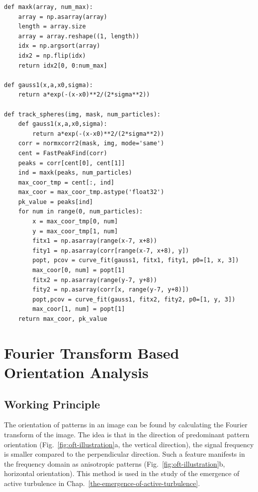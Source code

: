 \begin{verbatim}
def maxk(array, num_max):
    array = np.asarray(array)
    length = array.size
    array = array.reshape((1, length))
    idx = np.argsort(array)
    idx2 = np.flip(idx)
    return idx2[0, 0:num_max]

def gauss1(x,a,x0,sigma):
    return a*exp(-(x-x0)**2/(2*sigma**2))

def track_spheres(img, mask, num_particles):
    def gauss1(x,a,x0,sigma):
        return a*exp(-(x-x0)**2/(2*sigma**2))
    corr = normxcorr2(mask, img, mode='same')
    cent = FastPeakFind(corr)
    peaks = corr[cent[0], cent[1]]
    ind = maxk(peaks, num_particles)
    max_coor_tmp = cent[:, ind]
    max_coor = max_coor_tmp.astype('float32')
    pk_value = peaks[ind]
    for num in range(0, num_particles):
        x = max_coor_tmp[0, num]
        y = max_coor_tmp[1, num]
        fitx1 = np.asarray(range(x-7, x+8))
        fity1 = np.asarray(corr[range(x-7, x+8), y])
        popt, pcov = curve_fit(gauss1, fitx1, fity1, p0=[1, x, 3])
        max_coor[0, num] = popt[1]
        fitx2 = np.asarray(range(y-7, y+8))
        fity2 = np.asarray(corr[x, range(y-7, y+8)])
        popt,pcov = curve_fit(gauss1, fitx2, fity2, p0=[1, y, 3])
        max_coor[1, num] = popt[1]
    return max_coor, pk_value
\end{verbatim}


\section{Fourier Transform Based Orientation Analysis}
\label{sec:A-fourier-transform-based-orientation-analysis}
\subsection{Working Principle}
The orientation of patterns in an image can be found by calculating the Fourier transform of the image. The idea is that in the direction of predominant pattern orientation (Fig.~\ref{fig:oft-illustration}a, the vertical direction), the signal frequency is smaller compared to the perpendicular direction. Such a feature manifests in the frequency domain as anisotropic patterns (Fig.~\ref{fig:oft-illustration}b, horizontal orientation). This method is used in the study of the emergence of active turbulence in Chap.~\ref{the-emergence-of-active-turbulence}.

